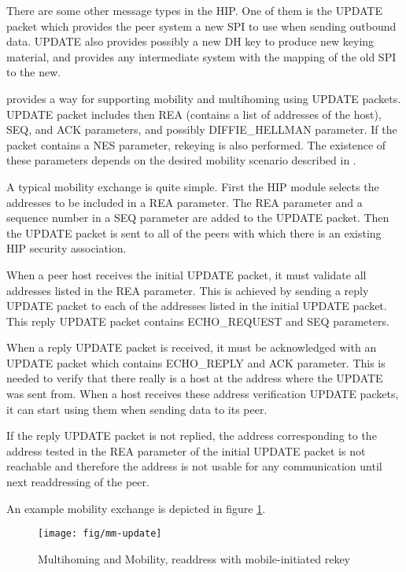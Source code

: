 There are some other message types in the \ac{HIP}. One of them is the
UPDATE packet which provides the peer system a new \ac{SPI} to use
when sending outbound data. UPDATE also provides possibly a new
\ac{DH} key to produce new keying material, and provides any
intermediate system with the mapping of the old
\ac{SPI} to the new.

\cite{hip-ietf-mm-00} provides a way for
supporting mobility and multihoming using UPDATE packets. UPDATE
packet includes then REA (contains a list of addresses of the host),
SEQ, and ACK parameters, and possibly DIFFIE\_HELLMAN parameter. If
the packet contains a NES parameter, rekeying is also performed. The
existence of these parameters depends on the desired mobility scenario
described in \cite{hip-ietf-mm-00}.

A typical mobility exchange is quite simple. First the HIP module
selects the addresses to be included in a REA parameter. The REA
parameter and a sequence number in a SEQ parameter are added to the
UPDATE packet. Then the UPDATE packet is sent to all of the peers with
which there is an existing HIP security association.

When a peer host receives the initial UPDATE packet, it must validate
all addresses listed in the REA parameter. This is achieved by sending
a reply UPDATE packet to each of the addresses listed in the initial
UPDATE packet. This reply UPDATE packet contains ECHO\_REQUEST and SEQ
parameters.

When a reply UPDATE packet is received, it must be acknowledged with
an UPDATE packet which contains ECHO\_REPLY and ACK parameter. This is
needed to verify that there really is a host at the address where the
UPDATE was sent from. When a host receives these address verification
UPDATE packets, it can start using them when sending data to its peer.

If the reply UPDATE packet is not replied, the address corresponding
to the address tested in the REA parameter of the initial UPDATE
packet is not reachable and therefore the address is not usable for
any communication until next readdressing of the peer.

An example mobility exchange is depicted in figure
\ref{fig:mm-readdress}.

\begin{figure}[hbt]
 \centering
 \texttt{[image: fig/mm-update]}
 \caption{Multihoming and Mobility, readdress with mobile-initiated rekey}
 \label{fig:mm-readdress}
\end{figure}

